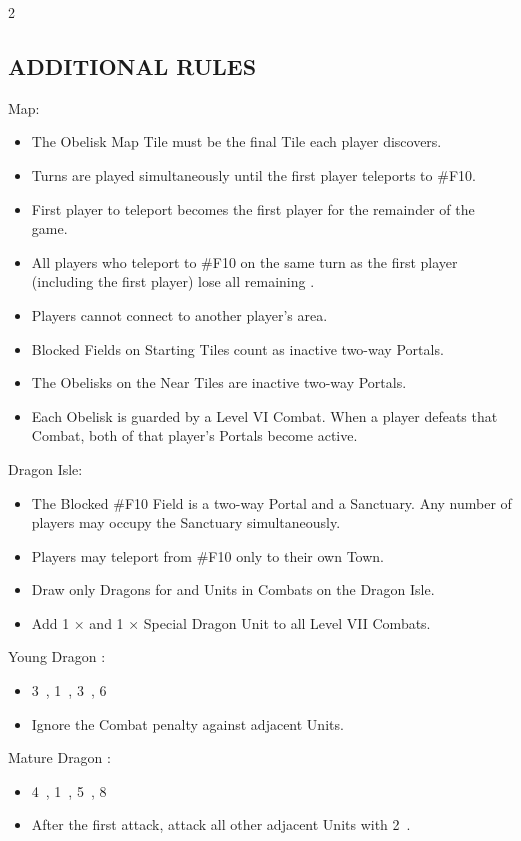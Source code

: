 \begin{multicols}{2}
\subsection*{\MakeUppercase{Additional Rules}}
Map:
\begin{itemize}
  \item The Obelisk Map Tile must be the final Tile each player discovers.
  \item Turns are played simultaneously until the first player teleports to \#F10.
  \item First player to teleport becomes the first player for the remainder of the game.
  \item All players who teleport to \#F10 on the same turn as the first player (including the first player) lose all remaining .
  \item Players cannot connect to another player's area.
  \item Blocked Fields on Starting Tiles count as inactive two-way Portals.
  \item The Obelisks on the Near Tiles are inactive two-way Portals.
  \item Each Obelisk is guarded by a Level VI Combat. When a player defeats that Combat, both of that player’s Portals become active.
\end{itemize}
Dragon Isle:
\begin{itemize}
  \item The Blocked \#F10 Field is a two-way Portal and a Sanctuary. Any number of players may occupy the Sanctuary simultaneously.
  \item Players may teleport from \#F10 only to their own Town.
  \item Draw only Dragons for  and  Units in Combats on the Dragon Isle.

\columnbreak

  \item Add 1 ×  and 1 ×  Special Dragon Unit to all Level VII Combats.
\end{itemize}

 Young Dragon :
\begin{itemize}
  \item 3~, 1~, 3~, 6~
  \item {} Ignore the Combat penalty against adjacent Units.
\end{itemize}

 Mature Dragon :
\begin{itemize}
  \item 4~, 1~, 5~, 8~
  \item {} After the first attack, attack all other adjacent Units with 2~.
\end{itemize}

\end{multicols}

